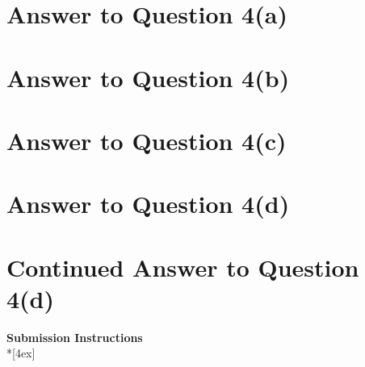 \documentclass[11pt]{article}
\begin{document}
\pagebreak[4]
\section*{Answer to Question 4(a)}

\pagebreak[4]
\section*{Answer to Question 4(b)}

\pagebreak[4]
\section*{Answer to Question 4(c)}

\pagebreak[4]
\section*{Answer to Question 4(d)}

\pagebreak[4]
\section*{Continued Answer to Question 4(d)}

\pagebreak[4]
\begin{center}
\LARGE{\bf \textsf{Submission Instructions}} \\*[4ex]
\end{center}
\end{document}
